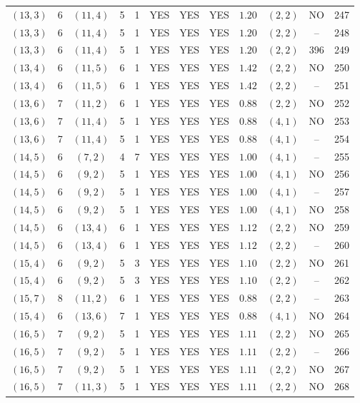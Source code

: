 \begin{longtable}{|c|c|c|c|c|c|c|c|c|c|c|c|}
$(13,3)$ & 6 & $(11,4)$ & 5 & 1 & YES & YES & YES & $1.20$ & $(2,2)$ & NO & 247\\
$(13,3)$ & 6 & $(11,4)$ & 5 & 1 & YES & YES & YES & $1.20$ & $(2,2)$ & -- & 248\\
$(13,3)$ & 6 & $(11,4)$ & 5 & 1 & YES & YES & YES & $1.20$ & $(2,2)$ & 396 & 249\\
$(13,4)$ & 6 & $(11,5)$ & 6 & 1 & YES & YES & YES & $1.42$ & $(2,2)$ & NO & 250\\
$(13,4)$ & 6 & $(11,5)$ & 6 & 1 & YES & YES & YES & $1.42$ & $(2,2)$ & -- & 251\\
$(13,6)$ & 7 & $(11,2)$ & 6 & 1 & YES & YES & YES & $0.88$ & $(2,2)$ & NO & 252\\
$(13,6)$ & 7 & $(11,4)$ & 5 & 1 & YES & YES & YES & $0.88$ & $(4,1)$ & NO & 253\\
$(13,6)$ & 7 & $(11,4)$ & 5 & 1 & YES & YES & YES & $0.88$ & $(4,1)$ & -- & 254\\
$(14,5)$ & 6 & $(7,2)$ & 4 & 7 & YES & YES & YES & $1.00$ & $(4,1)$ & -- & 255\\
$(14,5)$ & 6 & $(9,2)$ & 5 & 1 & YES & YES & YES & $1.00$ & $(4,1)$ & NO & 256\\
$(14,5)$ & 6 & $(9,2)$ & 5 & 1 & YES & YES & YES & $1.00$ & $(4,1)$ & -- & 257\\
$(14,5)$ & 6 & $(9,2)$ & 5 & 1 & YES & YES & YES & $1.00$ & $(4,1)$ & NO & 258\\
$(14,5)$ & 6 & $(13,4)$ & 6 & 1 & YES & YES & YES & $1.12$ & $(2,2)$ & NO & 259\\
$(14,5)$ & 6 & $(13,4)$ & 6 & 1 & YES & YES & YES & $1.12$ & $(2,2)$ & -- & 260\\
$(15,4)$ & 6 & $(9,2)$ & 5 & 3 & YES & YES & YES & $1.10$ & $(2,2)$ & NO & 261\\
$(15,4)$ & 6 & $(9,2)$ & 5 & 3 & YES & YES & YES & $1.10$ & $(2,2)$ & -- & 262\\
$(15,7)$ & 8 & $(11,2)$ & 6 & 1 & YES & YES & YES & $0.88$ & $(2,2)$ & -- & 263\\
$(15,4)$ & 6 & $(13,6)$ & 7 & 1 & YES & YES & YES & $0.88$ & $(4,1)$ & NO & 264\\
$(16,5)$ & 7 & $(9,2)$ & 5 & 1 & YES & YES & YES & $1.11$ & $(2,2)$ & NO & 265\\
$(16,5)$ & 7 & $(9,2)$ & 5 & 1 & YES & YES & YES & $1.11$ & $(2,2)$ & -- & 266\\
$(16,5)$ & 7 & $(9,2)$ & 5 & 1 & YES & YES & YES & $1.11$ & $(2,2)$ & NO & 267\\
$(16,5)$ & 7 & $(11,3)$ & 5 & 1 & YES & YES & YES & $1.11$ & $(2,2)$ & NO & 268\\

\end{longtable}
